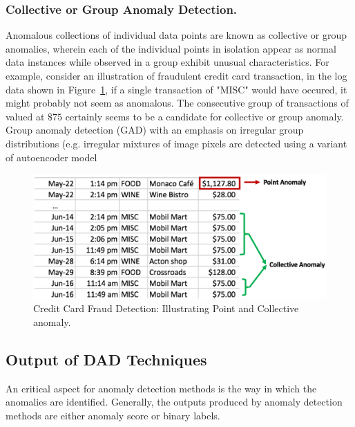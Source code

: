 \subsubsection{Collective or Group Anomaly Detection.}
Anomalous collections of individual data points are known as collective or group anomalies, wherein each of the individual points in isolation appear as normal data instances while observed in a group exhibit unusual characteristics. For example, consider an illustration of fraudulent credit card transaction, in the log data shown in Figure~\ref{fig:PointAndCollectiveAnomaly}, if a single transaction of "MISC" would have occured, it might probably not seem as anomalous. The consecutive group of transactions of valued at $\$75$ certainly seems to be a candidate for collective or group anomaly.
Group anomaly detection (GAD) with an emphasis on irregular group distributions (e.g. irregular mixtures of image pixels are detected using a variant of autoencoder model~\cite{chalapathy2018group,bontemps2016collective,araya2016collective,zhuang2017group}
\begin{figure}[h]
\includegraphics[scale=0.5]{images/PointAndCollectiveAnomaly}
\captionsetup{justification=centering}
\caption{Credit Card Fraud Detection: Illustrating Point and Collective anomaly.}
\label{fig:PointAndCollectiveAnomaly}
\end{figure}



\subsection {Output of DAD Techniques}
\label{output_of_dad_methods}
An critical aspect for anomaly detection methods is the way in which the anomalies are identified. Generally, the outputs produced by anomaly detection methods are either anomaly score or binary labels.

